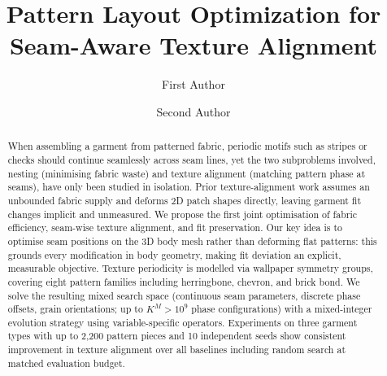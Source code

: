 \documentclass[runningheads]{llncs}
\begin{document}
\title{Pattern Layout Optimization for Seam-Aware Texture Alignment}

\author{
    First Author \and
    Second Author
}



\maketitle

\begin{abstract}
When assembling a garment from patterned fabric, periodic motifs such as
stripes or checks should continue seamlessly across seam lines, yet
the two subproblems involved, nesting (minimising fabric waste) and texture
alignment (matching pattern phase at seams), have only been studied in
isolation.
Prior texture-alignment work assumes an unbounded fabric supply and deforms
2D patch shapes directly, leaving garment fit changes implicit and
unmeasured.
We propose the first joint optimisation of fabric efficiency, seam-wise
texture alignment, and fit preservation.
Our key idea is to optimise seam positions on the 3D body mesh rather than
deforming flat patterns: this grounds every modification in body geometry,
making fit deviation an explicit, measurable objective.
Texture periodicity is modelled via wallpaper symmetry groups, covering
eight pattern families including herringbone, chevron, and brick bond.
We solve the resulting mixed search space (continuous seam parameters,
discrete phase offsets, grain orientations; up to $K^M > 10^9$
phase configurations) with a mixed-integer evolution strategy using
variable-specific operators.
Experiments on three garment types with up to 2{,}200 pattern pieces and
10 independent seeds show consistent improvement in texture alignment over
all baselines including random search at matched evaluation budget.
\end{abstract}









\end{document}
